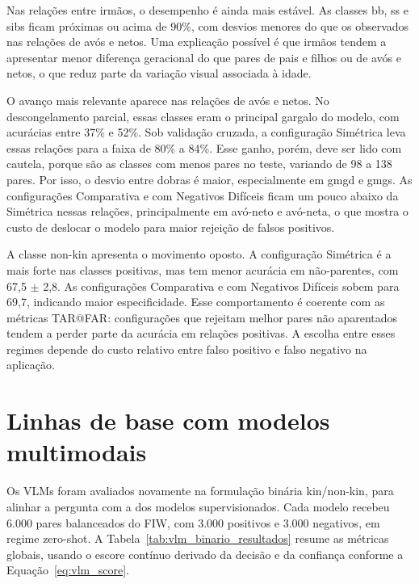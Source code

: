 Nas relações entre irmãos, o desempenho é ainda mais estável. As classes bb, ss e sibs ficam próximas ou acima de 90\%, com desvios menores do que os observados nas relações de avós e netos. Uma explicação possível é que irmãos tendem a apresentar menor diferença geracional do que pares de pais e filhos ou de avós e netos, o que reduz parte da variação visual associada à idade.

O avanço mais relevante aparece nas relações de avós e netos. No descongelamento parcial, essas classes eram o principal gargalo do modelo, com acurácias entre 37\% e 52\%. Sob validação cruzada, a configuração Simétrica leva essas relações para a faixa de 80\% a 84\%. Esse ganho, porém, deve ser lido com cautela, porque são as classes com menos pares no teste, variando de 98 a 138 pares. Por isso, o desvio entre dobras é maior, especialmente em gmgd e gmgs. As configurações Comparativa e com Negativos Difíceis ficam um pouco abaixo da Simétrica nessas relações, principalmente em avó-neto e avó-neta, o que mostra o custo de deslocar o modelo para maior rejeição de falsos positivos.

A classe non-kin apresenta o movimento oposto. A configuração Simétrica é a mais forte nas classes positivas, mas tem menor acurácia em não-parentes, com 67,5 $\pm$ 2,8. As configurações Comparativa e com Negativos Difíceis sobem para 69,7, indicando maior especificidade. Esse comportamento é coerente com as métricas TAR@FAR: configurações que rejeitam melhor pares não aparentados tendem a perder parte da acurácia em relações positivas. A escolha entre esses regimes depende do custo relativo entre falso positivo e falso negativo na aplicação.

\section{Linhas de base com modelos multimodais}

Os VLMs foram avaliados novamente na formulação binária kin/non-kin, para alinhar a pergunta com a dos modelos supervisionados. Cada modelo recebeu 6.000 pares balanceados do FIW, com 3.000 positivos e 3.000 negativos, em regime zero-shot. A Tabela~\ref{tab:vlm_binario_resultados} resume as métricas globais, usando o escore contínuo derivado da decisão e da confiança conforme a Equação~\ref{eq:vlm_score}.

